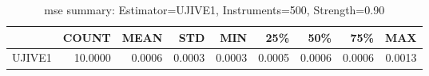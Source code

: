 \begin{table}[ht]
\centering
\caption{mse summary: Estimator=UJIVE1, Instruments=500, Strength=0.90}
\begin{tabular}{lrrrrrrrr}
\toprule
 & COUNT & MEAN & STD & MIN & 25\% & 50\% & 75\% & MAX \\
\midrule
UJIVE1 & 10.0000 & 0.0006 & 0.0003 & 0.0003 & 0.0005 & 0.0006 & 0.0006 & 0.0013 \\
\bottomrule
\end{tabular}
\end{table}
